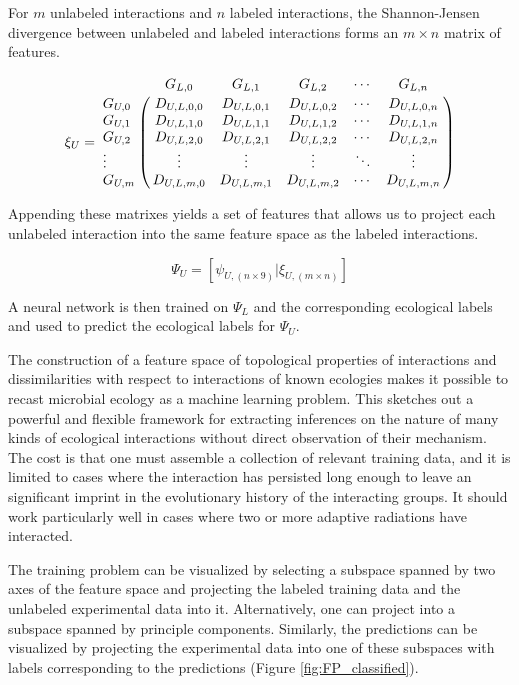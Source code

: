 \noindent For $m$ unlabeled interactions and $n$ labeled interactions, the Shannon-Jensen divergence between unlabeled and labeled interactions forms an $m\times n$ matrix of features.

\begin{equation}
\xi_U =
\bordermatrix{
        & G_{L,0}     & G_{L,1}     & G_{L,2}     & \cdots & G_{L,n}     \cr
G_{U,0} & D_{U,L,0,0} & D_{U,L,0,1} & D_{U,L,0,2} & \cdots & D_{U,L,0,n} \cr
G_{U,1} & D_{U,L,1,0} & D_{U,L,1,1} & D_{U,L,1,2} & \cdots & D_{U,L,1,n} \cr
G_{U,2} & D_{U,L,2,0} & D_{U,L,2,1} & D_{U,L,2,2} & \cdots & D_{U,L,2,n} \cr
\vdots  & \vdots      & \vdots      & \vdots      & \ddots & \vdots      \cr
G_{U,m} & D_{U,L,m,0} & D_{U,L,m,1} & D_{U,L,m,2} & \cdots & D_{U,L,m,n} \cr
}
\end{equation}

\noindent Appending these matrixes yields a set of features that allows us to project each unlabeled interaction into the same feature space as the labeled interactions.

\begin{equation}
    \Psi_{U} = \left[ \psi_{U,(n \times 9)} | \xi_{U,(m \times n)} \right]
\end{equation}

\noindent A neural network is then trained on $\Psi_L$ and the corresponding ecological labels and used to predict the ecological labels for $\Psi_U$. \cite{pedregosa2011scikit}

The construction of a feature space of topological properties of interactions and dissimilarities with respect to interactions of known ecologies makes it possible to recast microbial ecology as a machine learning problem. This sketches out a powerful and flexible framework for extracting inferences on the nature of many kinds of ecological interactions without direct observation of their mechanism. The cost is that one must assemble a collection of relevant training data, and it is limited to cases where the interaction has persisted long enough to leave an significant imprint in the evolutionary history of the interacting groups. It should work particularly well in cases where two or more adaptive radiations have interacted.

The training problem can be visualized by selecting a subspace spanned by two axes of the feature space and projecting the labeled training data and the unlabeled experimental data into it. Alternatively, one can project into a subspace spanned by principle components. Similarly, the predictions can be visualized by projecting the experimental data into one of these subspaces with labels corresponding to the predictions (Figure \ref{fig:FP_classified}).

